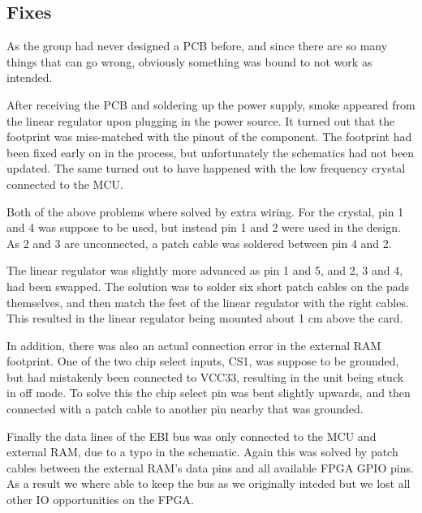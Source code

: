 
\subsection{Fixes}

As the group had never designed a PCB before, and since there
are so many things that can go wrong, obviously something was
bound to not work as intended.

After receiving the PCB and soldering up the power supply, smoke
appeared from the linear regulator upon plugging in the power
source. It turned out that the footprint was miss-matched with
the pinout of the component. The footprint had been fixed early
on in the process, but unfortunately the schematics had not been
updated. The same turned out to have happened with the low
frequency crystal connected to the MCU.

Both of the above problems where solved by extra wiring. For the
crystal, pin 1 and 4 was suppose to be used, but instead pin 1
and 2 were used in the design. As 2 and 3 are unconnected, a
patch cable was soldered between pin 4 and 2.

The linear regulator was slightly more advanced as pin 1 and 5,
and 2, 3 and 4, had been swapped. The solution was to solder six
short patch cables on the pads themselves, and then match the
feet of the linear regulator with the right cables. This
resulted in the linear regulator being mounted about 1 cm above
the card. 

In addition, there was also an actual connection error in the
external RAM footprint. One of the two chip select inputs, CS1, was
suppose to be grounded, but had mistakenly been connected to
VCC33, resulting in the unit being stuck in off mode. To solve
this the chip select pin was bent slightly upwards, and then
connected with a patch cable to another pin nearby that was
grounded. 

Finally the data lines of the EBI bus was only connected to the
MCU and external RAM, due to a typo in the schematic. Again this
was solved by patch cables between the external RAM's data pins
and all available FPGA GPIO pins. As a result we where able to 
keep the bus as we originally inteded  but we lost all other IO 
opportunities on the FPGA. 

